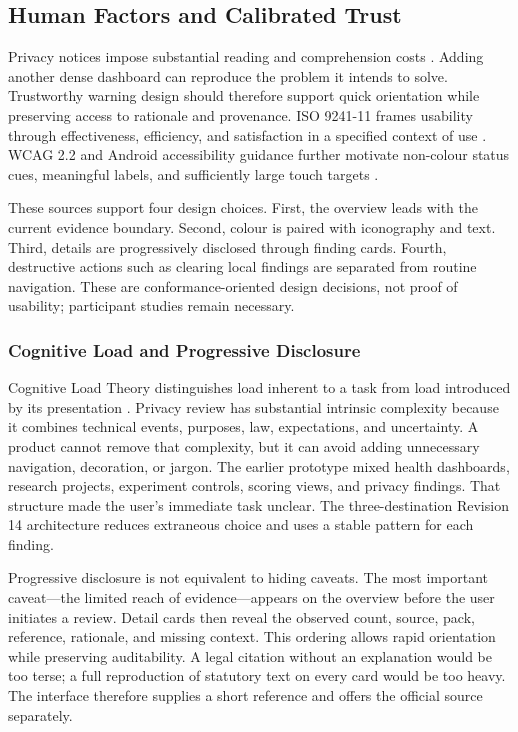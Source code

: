 \subsection{Human Factors and Calibrated Trust}

Privacy notices impose substantial reading and comprehension costs \cite{12,13}. Adding another dense dashboard can reproduce the problem it intends to solve. Trustworthy warning design should therefore support quick orientation while preserving access to rationale and provenance. ISO 9241-11 frames usability through effectiveness, efficiency, and satisfaction in a specified context of use \cite{iso924111}. WCAG 2.2 and Android accessibility guidance further motivate non-colour status cues, meaningful labels, and sufficiently large touch targets \cite{wcag22,androidaccess}.

These sources support four design choices. First, the overview leads with the current evidence boundary. Second, colour is paired with iconography and text. Third, details are progressively disclosed through finding cards. Fourth, destructive actions such as clearing local findings are separated from routine navigation. These are conformance-oriented design decisions, not proof of usability; participant studies remain necessary.

\subsubsection{Cognitive Load and Progressive Disclosure}

Cognitive Load Theory distinguishes load inherent to a task from load introduced by its presentation \cite{27}. Privacy review has substantial intrinsic complexity because it combines technical events, purposes, law, expectations, and uncertainty. A product cannot remove that complexity, but it can avoid adding unnecessary navigation, decoration, or jargon. The earlier prototype mixed health dashboards, research projects, experiment controls, scoring views, and privacy findings. That structure made the user's immediate task unclear. The three-destination Revision 14 architecture reduces extraneous choice and uses a stable pattern for each finding.

Progressive disclosure is not equivalent to hiding caveats. The most important caveat---the limited reach of evidence---appears on the overview before the user initiates a review. Detail cards then reveal the observed count, source, pack, reference, rationale, and missing context. This ordering allows rapid orientation while preserving auditability. A legal citation without an explanation would be too terse; a full reproduction of statutory text on every card would be too heavy. The interface therefore supplies a short reference and offers the official source separately.

